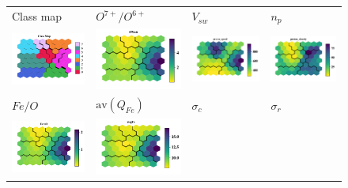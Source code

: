 \documentclass[utf8]{frontiersSCNS} %
\begin{document}
\begin{figure}[h!]\centering
	\begin{tabular}{CCCC}
		Class map & $O^{7+}/O^{6+}$ & $V_{sw}$ & $n_p$ \\
		\includegraphics[width=4cm]{Amaya/classmap} &
		\includegraphics[width=4cm]{Amaya/comp-map-log_O7to6} &
		\includegraphics[width=4cm]{Amaya/comp-map-log_proton_speed} &
		\includegraphics[width=4cm]{Amaya/comp-map-log_proton_density}\hfill
		\\
		$Fe/O$ & $\text{av}(Q_{Fe})$ & $\sigma_c$ & $\sigma_r$ \\
		\includegraphics[width=4cm]{Amaya/comp-map-log_FetoO} &
		\includegraphics[width=4cm]{Amaya/comp-map-log_avqFe} &

\end{tabular}
\end{figure}
\end{document}
